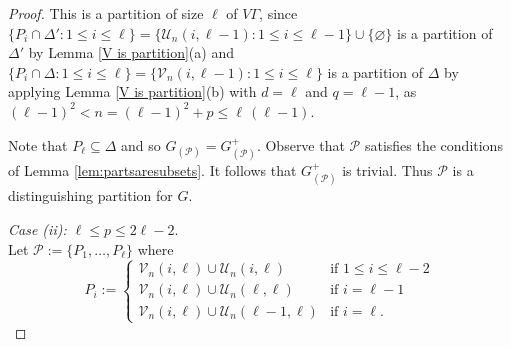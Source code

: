 \documentclass[10pt,a4paper]{amsart}
\DeclareMathOperator{\Diag}{Diag}
\DeclareMathOperator{\Sym}{Sym}
\begin{document}
\begin{proof}
This is a partition of size $\ell$ of \(V\Gamma\),
since
\(
\{P_i \cap \Delta' : 1 \leq i \leq \ell\}
= \{\mathcal{U}_n(i, \ell-1) : 1 \leq i \leq \ell - 1\} \cup \{\varnothing\}
\)
is a partition of $\Delta'$ by Lemma \ref{V is partition}(a)
and \(
\{P_i \cap \Delta : 1 \leq i \leq \ell\}
= \{\mathcal{V}_n(i, \ell-1) : 1 \leq i \leq \ell\}
\)
is a partition of $\Delta$
by applying Lemma \ref{V is partition}(b) with $d = \ell$ and $q = \ell - 1$, as $(\ell-1)^2 < n = (\ell-1)^{2} + p \leqslant  \ell \, (\ell - 1).$

%



Note that \(P_{\ell}\subseteq\Delta\) and so $G_{(\mathcal{P})}=G^+_{(\mathcal{P})}$. 
Observe that \(\mathcal{P}\) satisfies the conditions of Lemma \ref{lem:partsaresubsets}. It follows that $G^+_{(\mathcal{P})}$ is trivial.
Thus $\mathcal{P}$ is a distinguishing partition for $G$.
% 
 

\medskip\noindent
\emph{Case (ii): \(\ell\leqslant p\leqslant 2\ell-2\)}.\\ Let \(\mathcal{P}:=\{P_{1},\ldots, P_{\ell}\}\) where
\begin{equation*}
    P_{i}:=\begin{cases}
       \mathcal{V}_n(i,\ell)\cup \mathcal{U}_n(i,\ell)&\text{if }1\leqslant i\leqslant \ell-2\\
        
        \mathcal{V}_n(i,\ell)\cup  \mathcal{U}_n(\ell,\ell)&\text{if } i = \ell-1\\
        
        \mathcal{V}_n(i,\ell)\cup  \mathcal{U}_n(\ell-1,\ell)&\text{if }i=\ell.
    \end{cases}
\end{equation*}


\end{proof}
\end{document}
